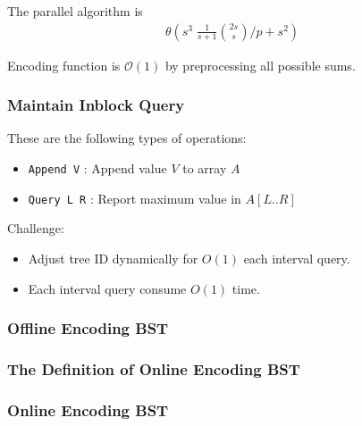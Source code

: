 \begin{frame}
	
	The parallel algorithm is 
	\begin{align*}
		\mathcal{\theta}\left(s^3 \; \frac{1}{s+1} \binom{2s}{s} \bigg/ p + s^2 \right)
	\end{align*}
\end{frame}

\begin{frame}
	
	Encoding function is $\mathcal{O}(1)$ by preprocessing all possible sums.
\end{frame}

\begin{frame}
	\frametitle{Maintain Inblock Query}
	These are the following types of operations:
	\begin{itemize}
		\item \texttt{Append V} : Append value $V$ to array $A$
		\item \texttt{Query L R} : Report maximum value in $A[L .. R]$
	\end{itemize}
	Challenge:
	\begin{itemize}
		\item Adjust tree ID dynamically for $O(1)$ each interval query.
		\item Each interval query consume $O(1)$ time.
	\end{itemize}
\end{frame}

\begin{frame}
	\frametitle{Offline Encoding BST}
	
\end{frame}

\begin{frame}
	\frametitle{The Definition of Online Encoding BST}
	
\end{frame}
\begin{frame}
	\frametitle{Online Encoding BST}
	
\end{frame}